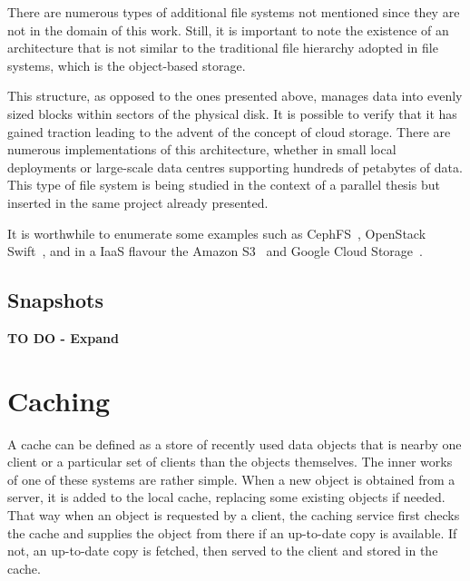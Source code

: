 There are numerous types of additional file systems not mentioned since they are not in the domain of this work. Still, it is important to note the existence of an architecture that is not similar to the traditional file hierarchy adopted in file systems, which is the object-based storage. 

This structure, as opposed to the ones presented above, manages data into evenly sized blocks within sectors of the physical disk. It is possible to verify that it has gained traction leading to the advent of the concept of cloud storage. There are numerous implementations of this architecture, whether in small local deployments or large-scale data centres supporting hundreds of petabytes of data.
This type of file system is being studied in the context of a parallel thesis but inserted in the same project already presented.

It is worthwhile to enumerate some examples such as CephFS~\cite{Weil2006}, OpenStack Swift~\cite{Swift2017}, and in a IaaS flavour the Amazon S3~\cite{aws_s3} and Google Cloud Storage~\cite{gcp_storage}.


\subsection{Snapshots} %
\label{sub:snapshots}

\textbf{TO DO - Expand}




\section{Caching} %
\label{sec:caching}

A cache can be defined as a store of recently used data objects that is nearby one client or a particular set of clients than the objects themselves. The inner works of one of these systems are rather simple. When a new object is obtained from a server, it is added to the local cache, replacing some existing objects if needed. That way when an object is requested by a client, the caching service first checks the cache and supplies the object from there if an up-to-date copy is available. If not, an up-to-date copy is fetched, then served to the client and stored in the cache. 

